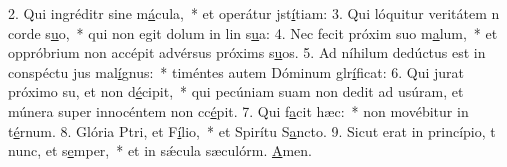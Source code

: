 2. Qui ingréditr sine m\uline{á}cula,~* et operátur jst\uline{í}tiam:
3. Qui lóquitur veritátem n corde s\uline{u}o,~* qui non egit dolum in lin s\uline{u}a:
4. Nec fecit próxim suo m\uline{a}lum,~* et oppróbrium non accépit advérsus próxims s\uline{u}os.
5. Ad níhilum dedúctus est in conspéctu jus mal\uline{í}gnus:~* timéntes autem Dóminum glr\uline{í}ficat:
6. Qui jurat próximo su, et non d\uline{é}cipit,~* qui pecúniam suam non dedit ad usúram, et múnera super innocéntem non cc\uline{é}pit.
7. Qui f\uline{a}cit hæc:~* non movébitur in t\uline{é}rnum.
8. Glória Ptri, et F\uline{í}lio,~* et Spirítu S\uline{a}ncto.
9. Sicut erat in princípio, t nunc, et s\uline{e}mper,~* et in sǽcula sæculórm. \uline{A}men.

